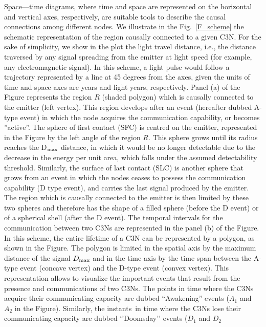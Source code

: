 \documentclass[crop]{CSLB}
\newcommand{\ceti}{C3N}
\newcommand{\cetis}{C3Ns}
\newcommand{\ffn}[1]{}
\begin{document}
\ffn{1} Space—time diagrams, where time and space are represented on
the horizontal and vertical axes, respectively, are suitable tools to
describe the causal connections among different nodes.
%
We illustrate in the Fig.~\ref{F_scheme} the schematic representation
of the region causally connected to a given \ceti{}.
%
For the sake of simplicity, we show in the plot the light travel
distance, i.e., the distance traversed by any signal spreading from
the emitter at light speed (for example, any electromagnetic signal).
%
In this scheme, a light pulse would follow a trajectory represented by
a line at 45 degrees from the axes, given the units of time and
space axes are years and light years, respectively.
%
Panel (a) of the Figure represents the region $R$ (shaded polygon)
which is causally connected to the emitter (left vertex).
%
This region develops after an event (hereafter dubbed A-type event) in
which the node acquires the communication capability, or becomes
''active''.
%
The sphere of first contact (SFC) is centred on the emitter,
represented in the Figure by the left angle of the region $R$.
%
This sphere grows until its radius reaches the D$_{\rm max}$ distance, in
which it would be no longer detectable due to the decrease in the
energy per unit area, which falls under the assumed detectability
threshold.
%
Similarly, the surface of last contact (SLC) is another sphere that
grows from an event in which the nodes ceases to possess the
communication capability (D type event), and carries the last signal
produced by the emitter.
%
The region which is causally connected to the emitter is then limited
by these two spheres and therefore has the shape of a filled sphere
(before the D event) or of a spherical shell (after the D event).
%
The temporal intervals for the communication between two \cetis{} are
represented in the panel (b) of the Figure.
%
In this scheme, the entire lifetime of a \ceti{} can be represented by
a polygon, as shown in the Figure.
%
The polygon is limited in the spatial axis by the maximum distance of
the signal $D_{\rm max}$ and in the time axis by the time span between the
A-type event (concave vertex) and the D-type event (convex vertex).
%
This representation allows to visualize the important events that
result from the presence and communications of two \cetis{}.
%
The points in time where the \cetis{} acquire their communicating
capacity are dubbed ``Awakening'' events ($A_1$ and $A_2$ in the
Figure).
%
Similarly, the instants in time where the \cetis{} lose their
communicating capacity are dubbed ‘’Doomsday’’ events ($D_1$ and $D_2$
\end{document}
